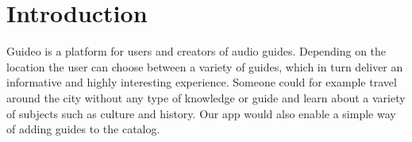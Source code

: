 \documentclass[12pt]{article}
\theoremstyle{definition}
\newenvironment{text}{
}{}
\begin{document}
\tableofcontents
\pagebreak
 
\section{Introduction}
\begin{text}
Guideo is a platform for users and creators of audio guides. Depending on the location the user can choose between a variety of guides, which in turn deliver
an informative and highly interesting experience. Someone could for example travel around the city without any type of knowledge or guide and learn about a variety of subjects
such as culture and history. Our app would also enable a simple way of adding guides to the catalog.   
 
\end{text}
\pagebreak
 
\end{document}
